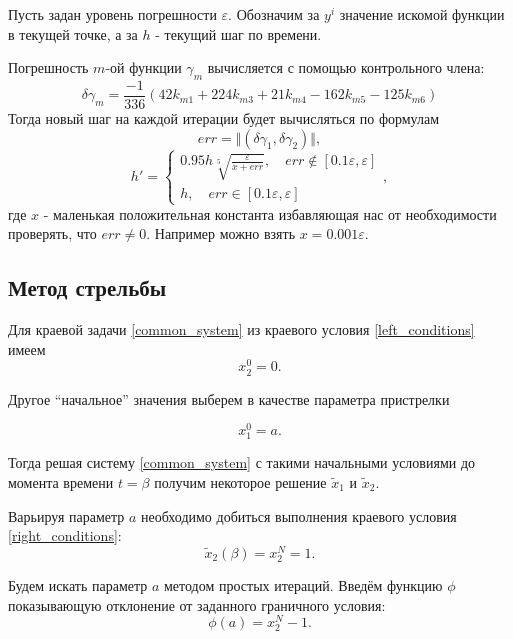 \documentclass[a4paper,12pt]{article}
\begin{document}
Пусть задан уровень погрешности \(\varepsilon\). Обозначим за \(y^{i}\)
значение искомой функции в текущей точке, а за \(h\) - текущий шаг по
времени.

Погрешность \(m\)-ой функции \(\gamma_{m}\) вычисляется с помощью контрольного члена:
\begin{equation*}
  \delta\gamma_{m} = \frac{-1}{336}\left(42 k_{m1}+224k_{m3}+21k_{m4}-162 k_{m5}-125 k_{m6}\right)
\end{equation*}
Тогда новый шаг на каждой итерации будет вычисляться по формулам
\begin{equation*}
  err = \Vert (\delta\gamma_{1}, \delta\gamma_{2})\Vert,
\end{equation*}
\begin{equation*}
  h'=\begin{cases}
    0.95 h \sqrt[5]{\frac{\varepsilon}{x+err}}, \quad err \not\in [0.1 \varepsilon, \varepsilon] \\
    h, \quad  err \in [0.1 \varepsilon, \varepsilon]
  \end{cases},
\end{equation*}
где \(x\) - маленькая
положительная константа избавляющая нас от необходимости проверять, что
\(err \neq 0\). Например можно взять \(x=0.001 \varepsilon\).

\subsection*{Метод стрельбы}

Для краевой задачи \cref{common_system} из краевого условия \cref{left_conditions} имеем
\begin{equation*}
  x_2^0=0.
\end{equation*}

Другое ``начальное'' значения выберем в качестве параметра пристрелки

\begin{equation*}
  x_1^0=a.
\end{equation*}

Тогда решая систему \cref{common_system} с такими начальными условиями до момента времени \(t=\beta\) получим некоторое решение \(\tilde{x}_1\) и \(\tilde{x}_2\).

Варьируя параметр \(a\) необходимо добиться выполнения краевого условия \cref{right_conditions}:
\begin{equation*}
  \tilde{x}_2(\beta)=x_2^N=1.
\end{equation*}

Будем искать параметр \(a\) методом простых итераций. Введём функцию \(\phi\) показывающую отклонение от заданного
граничного условия:
\begin{equation*}
  \phi(a)=x_2^N-1.
\end{equation*}
\end{document}
